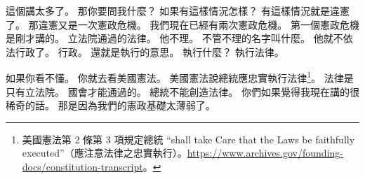 \hypertarget{w01:cue:2007}{}這個講太多了。
\hypertarget{w01:cue:2008}{}那你要問我什麼？
\hypertarget{w01:cue:2009}{}如果有這樣情況怎樣？
\hypertarget{w01:cue:2010}{}有這樣情況就是違憲了。
\hypertarget{w01:cue:2011}{}那違憲又是一次憲政危機。
\hypertarget{w01:cue:2012}{}我們現在已經有兩次憲政危機。
\hypertarget{w01:cue:2013}{}第一個憲政危機是剛才講的。
\hypertarget{w01:cue:2014}{}立法院通過的法律。
\hypertarget{w01:cue:2015}{}他不理。
\hypertarget{w01:cue:2016}{}不管不理的名字叫什麼。
\hypertarget{w01:cue:2017}{}他就不依法行政了。
\hypertarget{w01:cue:2018}{}行政。
\hypertarget{w01:cue:2019}{}還就是執行的意思。
\hypertarget{w01:cue:2020}{}執行什麼？
\hypertarget{w01:cue:2021}{}執行法律。

\hypertarget{w01:cue:2022}{}如果你看不懂。
\hypertarget{w01:cue:2023}{}你就去看美國憲法。
\hypertarget{w01:cue:2024}{}美國憲法說總統應忠實執行法律\footnote{美國憲法第 2 條第 3 項規定總統 “shall take Care that the Laws be faithfully executed”（應注意法律之忠實執行）。\url{https://www.archives.gov/founding-docs/constitution-transcript}。}。
\hypertarget{w01:cue:2025}{}法律是只有立法院。
\hypertarget{w01:cue:2026}{}國會才能通過的。
\hypertarget{w01:cue:2027}{}總統不能創造法律。
\hypertarget{w01:cue:2028}{}你們如果覺得我現在講的很稀奇的話。
\hypertarget{w01:cue:2029}{}那是因為我們的憲政基礎太薄弱了。

